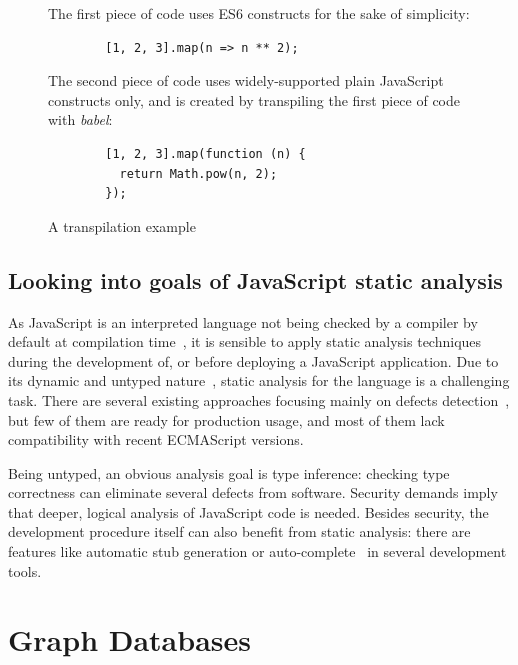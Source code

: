 \vspace{1em}
\begin{figure}[!htb]
	\centering
	\begin{minipage}{25em}
		The first piece of code uses ES6 constructs for the sake of simplicity:

		\begin{verbatim}
		[1, 2, 3].map(n => n ** 2);
		\end{verbatim}

		The second piece of code uses widely-supported plain JavaScript constructs only, and is created by transpiling the first piece of code with \emph{babel}:

		\begin{verbatim}
		[1, 2, 3].map(function (n) {
		  return Math.pow(n, 2);
		});
		\end{verbatim}
	\end{minipage}
  \caption{A transpilation example}
  \label{fig:transpiling-example}
\end{figure}


\subsection{Looking into goals of JavaScript static analysis}

As JavaScript is an interpreted language not being checked by a compiler by default at compilation time~\cite{373902}, it is sensible to apply static analysis techniques during the development of, or before deploying a JavaScript application. Due to its dynamic and untyped nature~\cite{flanagan2006javascript}, static analysis for the language is a challenging task. There are several existing approaches focusing mainly on defects detection~\cite{madsen2013practical, livshits2010gulfstream, jensen2009type}, but few of them are ready for production usage, and most of them lack compatibility with recent ECMAScript versions.

Being untyped, an obvious analysis goal is type inference: checking type correctness can eliminate several defects from software. Security demands imply that deeper, logical analysis of JavaScript code is needed. Besides security, the development procedure itself can also benefit from static analysis: there are features like automatic stub generation or auto-complete~\cite{madsen2013practical} in several development tools.~\cite{esprima-autocomplete, webstorm-autocomplete}


\section{Graph Databases}

